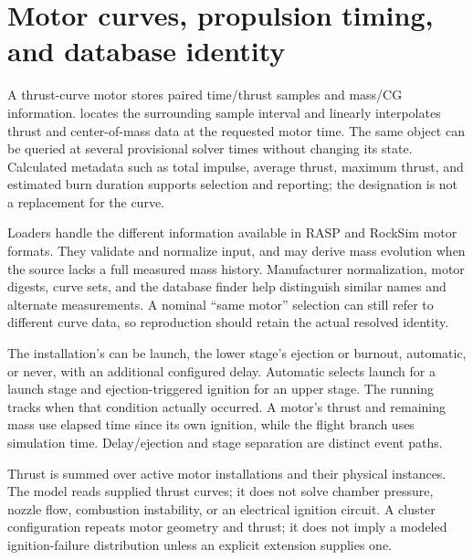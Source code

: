 
\section{Motor curves, propulsion timing, and database identity}
A thrust-curve motor stores paired time/thrust samples and mass/CG information.  locates the surrounding sample interval and linearly interpolates thrust and center-of-mass data at the requested motor time. The same object can be queried at several provisional solver times without changing its state. Calculated metadata such as total impulse, average thrust, maximum thrust, and estimated burn duration supports selection and reporting; the designation is not a replacement for the curve.

Loaders handle the different information available in RASP and RockSim motor formats. They validate and normalize input, and may derive mass evolution when the source lacks a full measured mass history. Manufacturer normalization, motor digests, curve sets, and the database finder help distinguish similar names and alternate measurements. A nominal ``same motor'' selection can still refer to different curve data, so reproduction should retain the actual resolved identity.

The installation's  can be launch, the lower stage's ejection or burnout, automatic, or never, with an additional configured delay. Automatic selects launch for a launch stage and ejection-triggered ignition for an upper stage. The running  tracks when that condition actually occurred. A motor's thrust and remaining mass use elapsed time since its own ignition, while the flight branch uses simulation time. Delay/ejection and stage separation are distinct event paths.

Thrust is summed over active motor installations and their physical instances. The model reads supplied thrust curves; it does not solve chamber pressure, nozzle flow, combustion instability, or an electrical ignition circuit. A cluster configuration repeats motor geometry and thrust; it does not imply a modeled ignition-failure distribution unless an explicit extension supplies one.

